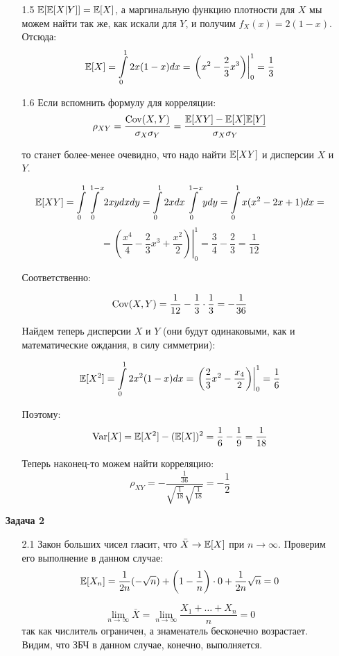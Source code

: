 \documentclass[12pt, a4paper]{article}\usepackage[]{graphicx}\usepackage[]{color}
\begin{document}
\begin{enumerate}
\begin{enumerate}
\item[1.5] $\mathbb{E}[\mathbb{E}[X|Y]] = \mathbb{E}[X]$, а маргинальную функцию плотности для $X$ мы можем найти так же, как искали для $Y$, и получим $f_X(x) = 2(1-x)$. Отсюда:
\[
\mathbb{E}[X] = \int \limits_{0}^{1} 2x(1-x)dx = \left .\left(x^2 - \frac{2}{3}x^3\right) \right|^{1}_{0} = \frac{1}{3}
\]

\item[1.6] Если вспомнить формулу для корреляции:
\[
\rho_{XY} = \frac{\operatorname{Cov}(X, Y)}{\sigma_X\sigma_Y}  = \frac{\mathbb{E}[XY] - \mathbb{E}[X]\mathbb{E}[Y]}{\sigma_X\sigma_Y}
\]

то станет более-менее очевидно, что надо найти $\mathbb{E}[XY]$ и дисперсии $X$ и $Y$.

\[
\mathbb{E}[XY] = \int \limits_{0}^{1} \int \limits_{0}^{1-x} 2xy dxdy = \int \limits_{0}^{1} 2xdx \int \limits_{0}^{1-x}ydy =  \int \limits_{0}^{1}x(x^2-2x+1)dx =
\]
\[
= \left. \left(\frac{x^4}{4} - \frac{2}{3}x^3 + \frac{x^2}{2}\right) \right|^{1}_{0} = \frac{3}{4}-\frac{2}{3} = \frac{1}{12}
\]

Соответственно:

\[
\operatorname{Cov}(X, Y) = \frac{1}{12} - \frac{1}{3}\cdot \frac{1}{3} = -\frac{1}{36}
\]

Найдем теперь дисперсии $X$ и $Y$ (они будут одинаковыми, как и математические ождания, в силу симметрии):

\[
\mathbb{E}[X^2] = \int \limits_{0}^{1} 2x^2(1-x)dx = \left. \left( \frac{2}{3}x^2 - \frac{x_4}{2} \right) \right|_{0}^{1} = \frac{1}{6}
\]

Поэтому:
\[
\operatorname{Var}[X] = \mathbb{E}[X^2] - (\mathbb{E}[X])^2 = \frac{1}{6} - \frac{1}{9} = \frac{1}{18}
\]

Теперь наконец-то можем найти корреляцию:
\[
\rho_{XY} = -\frac{\frac{1}{36}}{\sqrt{\frac{1}{18}}\sqrt{\frac{1}{18}}} = -\frac{1}{2}
\]
\end{enumerate}

\item[\textbf{Задача 2}]

\begin{enumerate}


\item[2.1] Закон больших чисел гласит, что $\bar{X} \rightarrow
\mathbb{E}[X]$ при $n\rightarrow \infty$. Проверим его выполнение в данном случае:
\[
\mathbb{E}[X_n] = \frac{1}{2n}(-\sqrt{n}) + \left(1-\frac{1}{n}\right)\cdot0 + \frac{1}{2n}\sqrt{n} = 0
\]

\[
\lim\limits_{n\rightarrow\infty} \bar{X} = \lim\limits_{n\rightarrow\infty} \frac{X_1 +\dots + X_n}{n} = 0
\]
так как числитель ограничен, а знаменатель бесконечно возрастает.
Видим, что ЗБЧ в данном случае, конечно, выполняется.


\end{enumerate}
\end{enumerate}
\end{document}
